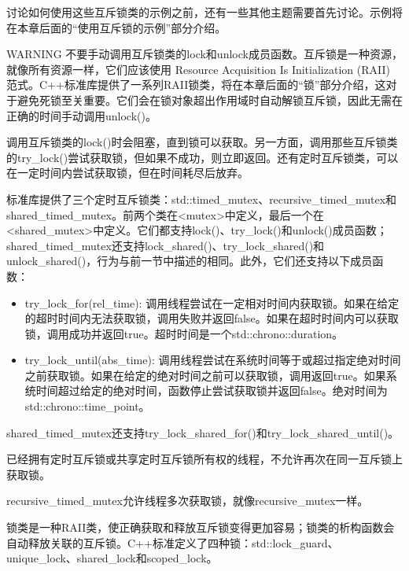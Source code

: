 讨论如何使用这些互斥锁类的示例之前，还有一些其他主题需要首先讨论。示例将在本章后面的“使用互斥锁的示例”部分介绍。

\begin{myWarning}{WARNING}
不要手动调用互斥锁类的lock和unlock成员函数。互斥锁是一种资源，就像所有资源一样，它们应该使用 Resource Acquisition Is Initialization (RAII) 范式。C++标准库提供了一系列RAII锁类，将在本章后面的“锁”部分介绍，这对于避免死锁至关重要。它们会在锁对象超出作用域时自动解锁互斥锁，因此无需在正确的时间手动调用unlock()。
\end{myWarning}


调用互斥锁类的lock()时会阻塞，直到锁可以获取。另一方面，调用那些互斥锁类的try\_lock()尝试获取锁，但如果不成功，则立即返回。还有定时互斥锁类，可以在一定时间内尝试获取锁，但在时间耗尽后放弃。

标准库提供了三个定时互斥锁类：std::timed\_mutex、recursive\_timed\_mutex和shared\_timed\_mutex。前两个类在<mutex>中定义，最后一个在<shared\_mutex>中定义。它们都支持lock()、try\_lock()和unlock()成员函数；shared\_timed\_mutex还支持lock\_shared()、try\_lock\_shared()和unlock\_shared()，行为与前一节中描述的相同。此外，它们还支持以下成员函数：

\begin{itemize}
\item
try\_lock\_for(rel\_time): 调用线程尝试在一定相对时间内获取锁。如果在给定的超时时间内无法获取锁，调用失败并返回false。如果在超时时间内可以获取锁，调用成功并返回true。超时时间是一个std::chrono::duration。

\item
try\_lock\_until(abs\_time): 调用线程尝试在系统时间等于或超过指定绝对时间之前获取锁。如果在给定的绝对时间之前可以获取锁，调用返回true。如果系统时间超过给定的绝对时间，函数停止尝试获取锁并返回false。绝对时间为std::chrono::time\_point。
\end{itemize}

shared\_timed\_mutex还支持try\_lock\_shared\_for()和try\_lock\_shared\_until()。

已经拥有定时互斥锁或共享定时互斥锁所有权的线程，不允许再次在同一互斥锁上获取锁。

recursive\_timed\_mutex允许线程多次获取锁，就像recursive\_mutex一样。


锁类是一种RAII类，使正确获取和释放互斥锁变得更加容易；锁类的析构函数会自动释放关联的互斥锁。C++标准定义了四种锁：std::lock\_guard、unique\_lock、shared\_lock和scoped\_lock。

